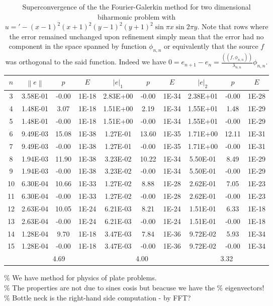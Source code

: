 \documentclass[a4paper,10pt]{article}
\newcommand{\norm}[1]{\ensuremath{\left\|#1\right\|}}
\newcommand{\seminorm}[1]{\ensuremath{\left|#1\right|}}
\newcommand{\Inner}[2]{\ensuremath{\left(\left(#1, #2\right)\right)}}
\begin{document}
  \begin{table}
    \centering
    \begin{tabular}{|c|c|c|c||c|c|c||c|c|c|}
    \hline
    $n$ & $\norm{e}$ & $p$ & $E$ & $\seminorm{e}_1$ & $p$ & $E$ & $\seminorm{e}_2$ & $p$ & $E$\\
\hline
3 & 3.58E-01 & -0.00 & 1E-18 & 2.83E+00 & -0.00 & 1E-34 & 2.38E+01 & -0.00 & 1E-28\\
4 & 1.48E-01 & 3.07 & 1E-18 & 1.51E+00 & 2.19 & 1E-34 & 1.55E+01 & 1.48 & 1E-29\\
5 & 1.48E-01 & -0.00 & 1E-18 & 1.51E+00 & -0.00 & 1E-34 & 1.55E+01 & -0.00 & 1E-29\\
6 & 9.49E-03 & 15.08 & 1E-38 & 1.27E-01 & 13.60 & 1E-35 & 1.71E+00 & 12.11 & 1E-31\\
7 & 9.49E-03 & -0.00 & 1E-38 & 1.27E-01 & -0.00 & 1E-35 & 1.71E+00 & -0.00 & 1E-31\\
8 & 1.94E-03 & 11.90 & 1E-38 & 3.23E-02 & 10.22 & 1E-34 & 5.50E-01 & 8.49 & 1E-29\\
9 & 1.94E-03 & -0.00 & 1E-38 & 3.23E-02 & -0.00 & 1E-34 & 5.50E-01 & -0.00 & 1E-29\\
10 & 6.30E-04 & 10.66 & 1E-33 & 1.27E-02 & 8.88 & 1E-28 & 2.62E-01 & 7.05 & 1E-23\\
11 & 6.30E-04 & -0.00 & 1E-33 & 1.27E-02 & -0.00 & 1E-28 & 2.62E-01 & -0.00 & 1E-23\\
12 & 2.63E-04 & 10.05 & 1E-24 & 6.21E-03 & 8.21 & 1E-24 & 1.51E-01 & 6.33 & 1E-18\\
13 & 2.63E-04 & -0.00 & 1E-24 & 6.21E-03 & -0.00 & 1E-24 & 1.51E-01 & -0.00 & 1E-18\\
14 & 1.28E-04 & 9.70 & 1E-18 & 3.47E-03 & 7.84 & 1E-36 & 9.72E-02 & 5.93 & 1E-34\\
15 & 1.28E-04 & -0.00 & 1E-18 & 3.47E-03 & -0.00 & 1E-36 & 9.72E-02 & -0.00 & 1E-34\\
\hline
    \hline
    & \multicolumn{3}{c||}{4.69} &
      \multicolumn{3}{c||}{4.00} &
      \multicolumn{3}{c|}{3.32}\\
    \hline
    \end{tabular}
    \caption{Superconvergence of the the Fourier-Galerkin method for two
    dimensional biharmonic problem with
    $u='- \left(x - 1\right)^{2} \left(x + 1\right)^{2} \left(y - 1\right)^{2}
    \left(y + 1\right)^{2} \sin{\pi x} \sin{2 \pi y}$. Note that rows where
    the error remained unchanged upon refinement simply mean that the error
    had no component in the space spanned by function $\phi_{n, n}$ or
    equivalently that the source $f$ was orthogonal to the said function. Indeed
    we have $0=e_{n+1}-e_{n}=\frac{\Inner{f}{\phi_{n, n}}}{\lambda_{n,
    n}}\phi_{n, n}$.
    }
    \label{tab:eig_b_2dsup}
  \end{table}
  \% We have method for physics of plate problems.\\
  \% The properties are not due to sines cosis but beacuse we have the
  \% eigenvectors!\\
  \% Bottle neck is the right-hand side computation - by FFT?
\end{document}
